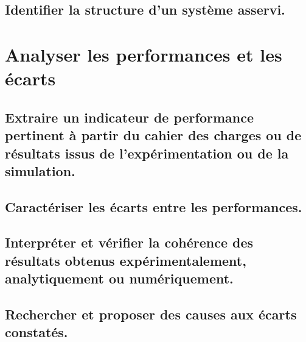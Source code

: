 \documentclass[10pt,fleqn]{book}
\begin{document}
\begin{multicols}{2} 

\end{multicols}

\subsection{Identifier la structure d'un système asservi.} 

\begin{multicols}{2} 

\end{multicols}

\section{Analyser les performances et les écarts} 

\subsection{Extraire un indicateur de performance pertinent à partir du cahier des charges ou de résultats issus de l'expérimentation ou de la simulation.} 

\begin{multicols}{2} 

\end{multicols}

\subsection{Caractériser les écarts entre les performances.} 

\begin{multicols}{2} 

\end{multicols}

\subsection{Interpréter et vérifier la cohérence des résultats obtenus expérimentalement, analytiquement ou numériquement. } 

\begin{multicols}{2} 

\end{multicols}

\subsection{Rechercher et proposer des causes aux écarts constatés.} 
\end{document}
